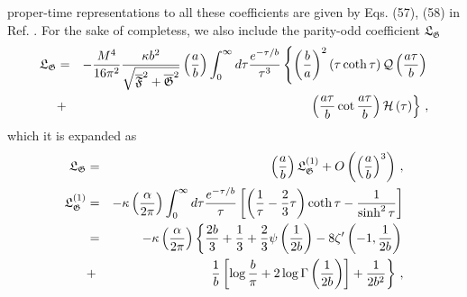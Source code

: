 \documentclass[12pt]{article}
\begin{document}
\begin{appendices}
proper-time representations to all these coefficients are given by Eqs.
(57), (58) in Ref. \cite{AdoGitSha2016}. For the sake of completess, we also
include the parity-odd coefficient $\mathfrak{L}_{\mathfrak{G}}$%
\begin{eqnarray}
\mathfrak{L}_{\mathfrak{G}} &=&-\frac{M^{4}}{16\pi ^{2}}\frac{\kappa b^{2}}{%
\sqrt{\overline{\mathfrak{F}}^{2}+\overline{\mathfrak{G}}^{2}}}\left( \frac{a%
}{b}\right) \int_{0}^{\infty }d\tau \frac{e^{-\tau /b}}{\tau ^{3}}\left\{
\left( \frac{b}{a}\right) ^{2}\left( \tau \coth \tau \right) \mathcal{Q}%
\left( \frac{a\tau }{b}\right) \right.  \notag \\
&+&\left. \left( \frac{a\tau }{b}\cot \frac{a\tau }{b}\right) \mathcal{H}%
\left( \tau \right) \right\} \,,  \label{LG}
\end{eqnarray}%
which it is expanded as%
\begin{eqnarray}
\mathfrak{L}_{\mathfrak{G}} &=&\left( \frac{a}{b}\right) \mathfrak{L}_{%
\mathfrak{G}}^{\left( 1\right) }+O\left( \left( \frac{a}{b}\right)
^{3}\right) \,,  \notag \\
\mathfrak{L}_{\mathfrak{G}}^{\left( 1\right) } &=&-\kappa \left( \frac{%
\alpha }{2\pi }\right) \int_{0}^{\infty }d\tau \frac{e^{-\tau /b}}{\tau }%
\left[ \left( \frac{1}{\tau }-\frac{2}{3}\tau \right) \coth \tau -\frac{1}{%
\sinh ^{2}\tau }\right]  \notag \\
&=&-\kappa \left( \frac{\alpha }{2\pi }\right) \left\{ \frac{2b}{3}+\frac{1}{%
3}+\frac{2}{3}\psi \left( \frac{1}{2b}\right) -8\zeta ^{\prime }\left( -1,%
\frac{1}{2b}\right) \right.  \notag \\
&+&\left. \frac{1}{b}\left[ \log \frac{b}{\pi }+2\log \Gamma \left( \frac{1}{%
2b}\right) \right] +\frac{1}{2b^{2}}\right\} \,,  \label{apb3}
\end{eqnarray}


\end{appendices}
\end{document}
